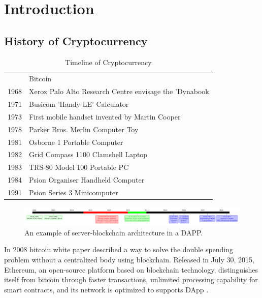 \section{Introduction}

\subsection[Overview]{History of Cryptocurrency}
\begin{table}
\renewcommand\arraystretch{1.4}
\captionsetup{singlelinecheck=false, labelfont=sc, labelsep=quad}
\caption{Timeline of Cryptocurrency}%
\begin{tabular}{@{\,}r <{\hskip 2pt} !{\foo} >{\raggedright\arraybackslash}p{5cm}}
\toprule
{} & Bitcoin\\
1968 & Xerox Palo Alto Research Centre envisage the 'Dynabook\\
1971 & Busicom 'Handy-LE' Calculator\\
1973 & First mobile handset invented by Martin Cooper\\
1978 & Parker Bros. Merlin Computer Toy\\
1981 & Osborne 1 Portable Computer\\
1982 & Grid Compass 1100 Clamshell Laptop\\
1983 & TRS-80 Model 100 Portable PC\\
1984 & Psion Organiser Handheld Computer\\
1991 & Psion Series 3 Minicomputer\\
\end{tabular}
\end{table}

\begin{figure}[ht]
\begin{adjustbox}{center,max width=1.1\textwidth}
\includegraphics[width=1.2\linewidth]{Diagrams/advancedTimeline.pdf}
\end{adjustbox}
\caption{An example of server-blockchain architecture in a DAPP.}
\label{fig:dappArc}
\end{figure}

In 2008 bitcoin white paper \cite{bitcoinWhitePaper:Online} described a way to solve the double spending problem without a centralized body using blockchain.  Released in July 30, 2015, Ethereum, an open-source platform based on blockchain technology, distinguishes itself from bitcoin through faster transactions, unlimited processing capability for \glspl{smart contract}, and its network is optimized to supports \gls{DApp} \cite{ethereumWhitePaper:Online}.


